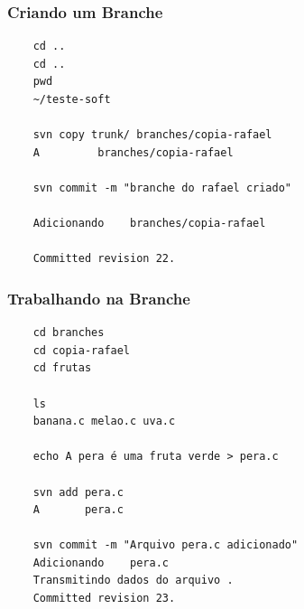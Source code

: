 \documentclass{beamer}
\begin{document}
\begin{frame}[fragile]
    \frametitle{Criando um Branche}

    \begin{bash}{}
    {\tiny
    \begin{verbatim}
    cd ..
    cd ..
    pwd
    ~/teste-soft

    svn copy trunk/ branches/copia-rafael
    A         branches/copia-rafael

    svn commit -m "branche do rafael criado"

    Adicionando    branches/copia-rafael

    Committed revision 22.
    \end{verbatim}
    }
    \end{bash}

\end{frame}


\begin{frame}[fragile]
    \frametitle{Trabalhando na Branche}

    \begin{bash}{}
    {\tiny
    \begin{verbatim}
    cd branches
    cd copia-rafael
    cd frutas

    ls
    banana.c melao.c uva.c

    echo A pera é uma fruta verde > pera.c

    svn add pera.c
    A       pera.c

    svn commit -m "Arquivo pera.c adicionado"
    Adicionando    pera.c
    Transmitindo dados do arquivo .
    Committed revision 23.
    \end{verbatim}
    }
    \end{bash}

\end{frame}
\end{document}
